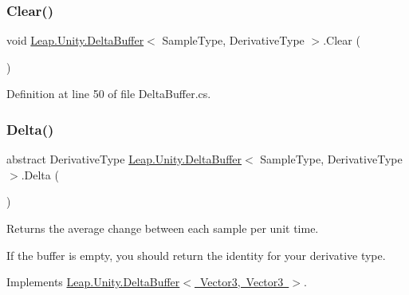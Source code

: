 \subsubsection{\texorpdfstring{Clear()}{Clear()}}
{\footnotesize\ttfamily void \mbox{\hyperlink{class_leap_1_1_unity_1_1_delta_buffer}{Leap.\+Unity.\+Delta\+Buffer}}$<$ Sample\+Type, Derivative\+Type $>$.Clear (\begin{DoxyParamCaption}{ }\end{DoxyParamCaption})}



Definition at line 50 of file Delta\+Buffer.\+cs.

\mbox{\label{class_leap_1_1_unity_1_1_delta_buffer_a8700bc7a1676ba39977f58debf74f5df}} 
\subsubsection{\texorpdfstring{Delta()}{Delta()}\hspace{0.1cm}{\footnotesize\ttfamily [1/2]}}
{\footnotesize\ttfamily abstract Derivative\+Type \mbox{\hyperlink{class_leap_1_1_unity_1_1_delta_buffer}{Leap.\+Unity.\+Delta\+Buffer}}$<$ Sample\+Type, Derivative\+Type $>$.Delta (\begin{DoxyParamCaption}{ }\end{DoxyParamCaption})\hspace{0.3cm}{\ttfamily [pure virtual]}}



Returns the average change between each sample per unit time. 

If the buffer is empty, you should return the identity for your derivative type. 

Implements \mbox{\hyperlink{class_leap_1_1_unity_1_1_delta_buffer_a8700bc7a1676ba39977f58debf74f5df}{Leap.\+Unity.\+Delta\+Buffer$<$ Vector3, Vector3 $>$}}.



